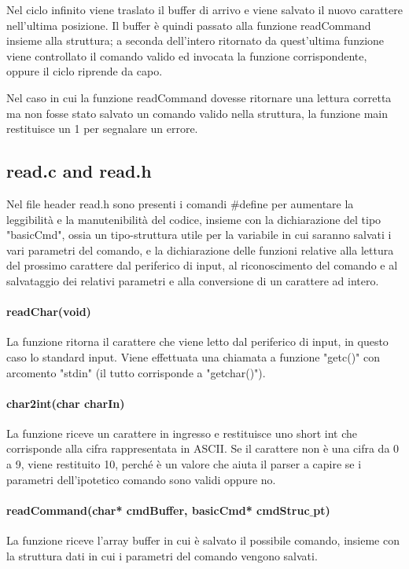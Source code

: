 \documentclass[a4paper]{article}
\begin{document}
		Nel ciclo infinito viene traslato il buffer di arrivo e viene salvato il nuovo carattere nell'ultima
		posizione.
		Il buffer è quindi passato alla funzione readCommand insieme alla struttura; a seconda dell'intero
		ritornato da quest'ultima funzione viene controllato il comando valido ed invocata la funzione 
		corrispondente, oppure il ciclo riprende da capo.

		Nel caso in cui la funzione readCommand dovesse ritornare una lettura corretta ma non fosse stato
		salvato un comando valido nella struttura, la funzione main restituisce un 1 per segnalare un errore.
	\subsection{read.c and read.h}
		Nel file header read.h sono presenti i comandi $\#$define per aumentare la leggibilità e la manutenibilità
		del codice, insieme con la dichiarazione del tipo "basicCmd", ossia un tipo-struttura  utile per la variabile
		in cui saranno salvati i vari parametri del comando, e la dichiarazione delle funzioni relative alla
		lettura del prossimo carattere dal periferico di input, al riconoscimento del comando e al salvataggio
		dei relativi parametri e alla conversione di un carattere ad intero. 
		\paragraph{readChar(void)}
			La funzione ritorna il carattere che viene letto dal periferico di input, in questo caso lo standard input.
			Viene effettuata una chiamata a funzione "getc()" con arcomento "stdin" (il tutto corrisponde a "getchar()").
		\paragraph{char2int(char charIn)}
			La funzione riceve un carattere in ingresso e restituisce uno short int che corrisponde alla cifra 
			rappresentata in ASCII. Se il carattere non è una cifra da 0 a 9, viene restituito 10, perché è un
			valore che aiuta il parser a capire se i parametri dell'ipotetico comando sono validi oppure no.
		\paragraph{readCommand(char* cmdBuffer, basicCmd* cmdStruc$\_$pt)}
			La funzione riceve l'array buffer in cui è salvato il possibile comando, insieme con la struttura dati in
			cui i parametri del comando vengono salvati.
\end{document}
